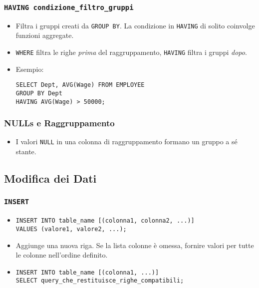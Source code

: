 	\subsubsection{\texttt{HAVING condizione\_filtro\_gruppi}}
	\begin{itemize}
		\item Filtra i gruppi creati da \texttt{GROUP BY}. La condizione in \texttt{HAVING} di solito coinvolge funzioni aggregate.
		\item \texttt{WHERE} filtra le righe \textit{prima} del raggruppamento, \texttt{HAVING} filtra i gruppi \textit{dopo}.
		\item Esempio:
		\begin{verbatim}
SELECT Dept, AVG(Wage) FROM EMPLOYEE
GROUP BY Dept
HAVING AVG(Wage) > 50000;
		\end{verbatim}
	\end{itemize}
	
	\subsubsection{NULLs e Raggruppamento}
	\begin{itemize}
		\item I valori \texttt{NULL} in una colonna di raggruppamento formano un gruppo a sé stante.
	\end{itemize}
	
	\subsection{Modifica dei Dati}
	\subsubsection{\texttt{INSERT}}
	\begin{itemize}
		\item
		\begin{verbatim}
INSERT INTO table_name [(colonna1, colonna2, ...)]
VALUES (valore1, valore2, ...);
		\end{verbatim}
		\item Aggiunge una nuova riga. Se la lista colonne è omessa, fornire valori per tutte le colonne nell'ordine definito.
		\item
		\begin{verbatim}
INSERT INTO table_name [(colonna1, ...)]
SELECT query_che_restituisce_righe_compatibili;
		\end{verbatim}
	\end{itemize}
	
